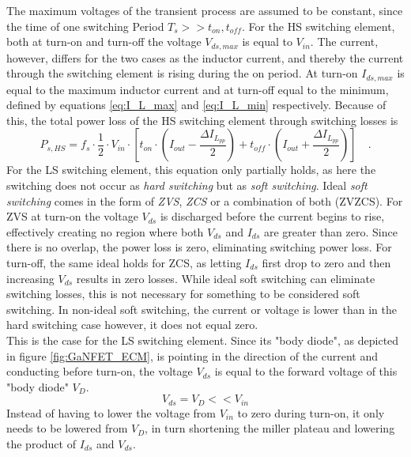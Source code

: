 The maximum voltages of the transient process are assumed to be constant, since the time of one switching Period $T_s >> t_{on},t_{off}$. For the HS switching element, both at turn-on and turn-off the voltage $V_{ds,max}$ is equal to $V_{in}$. The current, however, differs for the two cases as the inductor current, and thereby the current through the switching element is rising during the on period. At turn-on $I_{ds,max}$ is equal to 
the maximum inductor current and at turn-off equal to the minimum, defined by equations \ref{eq:I_L_max} and \ref{eq:I_L_min} respectively. Because of this, the total power loss of the HS switching element through switching losses is
\begin{equation}
    P_{s,HS} = f_s \cdot \frac{1}{2} \cdot V_{in} \cdot \left[t_{on} \cdot \left(I_{out} - \frac{\Delta I_{L_{pp}}}{2}\right) + t_{off} \cdot \left(I_{out} + \frac{\Delta I_{L_{pp}}}{2}\right)\right] \quad\text{.}
\end{equation}
For the LS switching element, this equation only partially holds, as here the switching does not occur as \textit{hard switching} but as \textit{soft switching}. Ideal \textit{soft switching} comes in the form of \textit{\ac{ZVS}}, \textit{\ac{ZCS}} or a combination of both (ZVZCS). For \ac{ZVS} at turn-on the voltage $V_{ds}$ is discharged before the current begins to rise, effectively creating no region where both $V_{ds}$ and $I_{ds}$ are greater than zero. Since there is no overlap, the power loss is zero, eliminating switching power loss. For turn-off, the same ideal holds for \ac{ZCS}, as letting $I_{ds}$ first drop to zero and then increasing $V_{ds}$ results in zero losses. While ideal soft switching can eliminate switching losses, this is not necessary for something to be considered soft switching. In non-ideal soft switching, the current or voltage is lower than in the hard switching case however, it does not equal zero. \cite{havanurBewareZeroVoltage2017}\\
This is the case for the \ac{LS} switching element. Since its "body diode", as depicted in figure \ref{fig:GaNFET_ECM}, is pointing in the direction of the current and conducting before turn-on, the voltage $V_{ds}$ is equal to the forward voltage of this "body diode" $V_D$.
\begin{equation}
    V_{ds} = V_D << V_{in}
\end{equation}
Instead of having to lower the voltage from $V_{in}$ to zero during turn-on, it only needs to be lowered from $V_D$, in turn shortening the miller plateau and lowering the product of $I_{ds}$ and $V_{ds}$.
